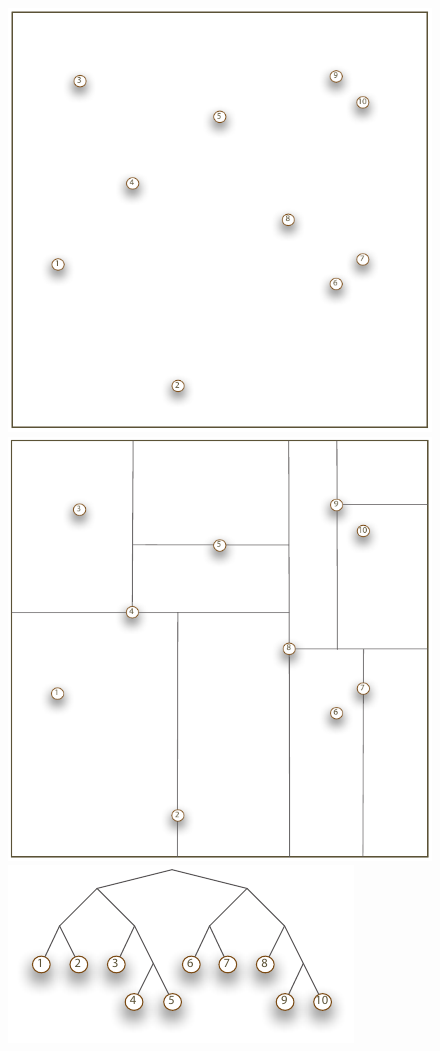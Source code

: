 \begin{frame}[fragile]
\begin{figure}
\begin{minipage}{0.75\linewidth}
    \includegraphics[scale=0.2]{figures/spatial-points.pdf}
    \hfill
    \includegraphics[scale=0.2]{figures/spatial-kd-split.pdf}
    \hfill
    \includegraphics[scale=0.6]{figures/spatial-kd-tree.pdf}
  \end{minipage}
  \end{figure}
%
\end{frame}

